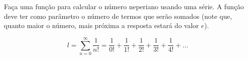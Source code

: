 
\question[10]

Faça uma função para calcular o número neperiano usando uma série. A função deve ter como parâmetro o número de termos que serão somados (note que, quanto maior o número, mais próxima a resposta estará do valor $e$).

\begin{equation*}
	l = \sum_{n=0}^{\infty} \frac{1}{n!} = \frac{1}{0!} + \frac{1}{1!}  + \frac{1}{2!}  + \frac{1}{3!} + \frac{1}{4!} + \ldots 
\end{equation*}
